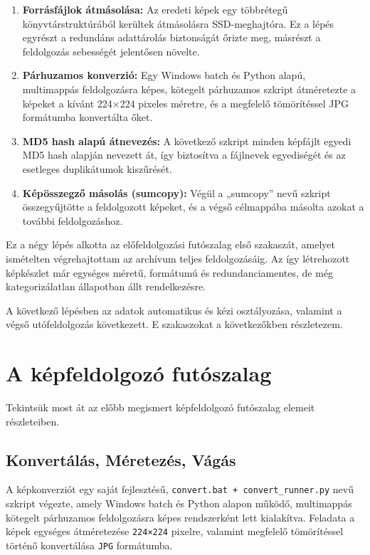             \begin{enumerate}
                \item \textbf{Forrásfájlok átmásolása:} Az eredeti képek egy többrétegű könyvtárstruktúrából kerültek átmásolásra SSD-meghajtóra. Ez a lépés egyrészt a redundáns adattárolás biztonságát őrizte meg, másrészt a feldolgozás sebességét jelentősen növelte.
                
                \item \textbf{Párhuzamos konverzió:} Egy Windows batch és Python alapú, multimappás feldolgozásra képes, kötegelt párhuzamos szkript átméretezte a képeket a kívánt 224×224 pixeles méretre, és a megfelelő tömörítéssel JPG formátumba konvertálta őket.
                
                \item \textbf{MD5 hash alapú átnevezés:} A következő szkript minden képfájlt egyedi MD5 hash alapján nevezett át, így biztosítva a fájlnevek egyediségét és az esetleges duplikátumok kiszűrését.
                
                \item \textbf{Képösszegző másolás (sumcopy):} Végül a „sumcopy” nevű szkript összegyűjtötte a feldolgozott képeket, és a végső célmappába másolta azokat a további feldolgozáshoz.
            \end{enumerate}

            Ez a négy lépés alkotta az előfeldolgozási futószalag első szakaszát, amelyet ismételten végrehajtottam az archívum teljes feldolgozásáig. Az így létrehozott képkészlet már egységes méretű, formátumú és redundanciamentes, de még kategorizálatlan állapotban állt rendelkezésre.

            A következő lépésben az adatok automatikus és kézi osztályozása, valamint a végső utófeldolgozás következett. E szakaszokat a következőkben részletezem.

        \section{A képfeldolgozó futószalag}
            Tekintsük most át az előbb megismert képfeldolgozó futószalag elemeit részleteiben.

        \subsection{Konvertálás, Méretezés, Vágás}

            A képkonverziót egy saját fejlesztésű, \texttt{convert.bat + convert\_runner.py} nevű szkript végezte, amely Windows batch és Python alapon működő, multimappás kötegelt párhuzamos feldolgozásra képes rendszerként lett kialakítva. Feladata a képek egységes átméretezése \texttt{224×224} pixelre, valamint megfelelő tömörítéssel történő konvertálása \texttt{JPG} formátumba.
            
